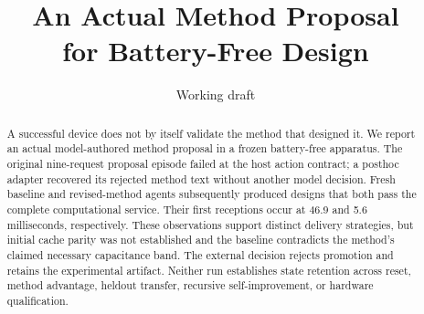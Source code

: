 \documentclass[10pt]{article}
\title{An Actual Method Proposal\\for Battery-Free Design}
\author{Working draft}
\date{}
\begin{document}
\maketitle
\begin{abstract}
A successful device does not by itself validate the method that designed it.
We report an actual model-authored method proposal in a frozen battery-free
apparatus. The original nine-request proposal episode failed at the host action
contract; a posthoc adapter recovered its rejected method text without another
model decision. Fresh baseline and revised-method agents subsequently produced
designs that both pass the complete computational service. Their first receptions
occur at 46.9 and 5.6 milliseconds, respectively. These observations support
distinct delivery strategies, but initial cache parity was not established and
the baseline contradicts the method's claimed necessary capacitance band.
The external decision rejects promotion and retains the experimental artifact.
Neither run establishes state retention across reset, method advantage,
heldout transfer, recursive self-improvement, or hardware qualification.
\end{abstract}

\end{document}
